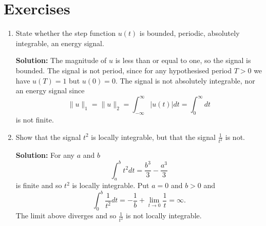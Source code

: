 \documentclass[11pt,a4paper]{book}
\theoremstyle{plain}
\numberwithin{equation}{section}
\newcommand{\abs}[1]{\left\vert #1 \right\vert}
\newenvironment{solution}{\begin{footnotesize}\textbf{Solution:}}{\end{footnotesize}}
\newenvironment{excersizelist}{%
  \renewcommand*{\theenumi}{\thechapter.\arabic{enumi}}%
  \newcommand\itemadvanced{\stepcounter{enumi}\item[$\ast$\, \theenumi.]}
  \begin{enumerate}
}{%
  \end{enumerate}
}
\begin{document}
\section{Exercises}

\begin{excersizelist}

\item \label{excer:stepfunction} State whether the step function $u(t)$ is bounded, periodic, %
absolutely integrable, an energy signal.
\begin{solution}
The magnitude of $u$ is less than or equal to one, so the signal is bounded.  The signal is not period, since for any hypothesised period $T > 0$ we have $u(T) = 1$ but $u(0) = 0$.  %
The signal is not absolutely integrable, nor an energy signal since
\[
\|u\|_1 = \|u\|_2 = \int_{-\infty}^\infty \abs{u(t)} dt = \int_{0}^\infty dt
\]
is not finite.
\end{solution}

\item \label{exer:oneontnotlocallyint} Show that the signal $t^2$ is locally integrable, but that the signal $\frac{1}{t^2}$ is not. 
\begin{solution}
For any $a$ and $b$
\[
\int_a^b t^2 dt = \frac{b^3}{3} - \frac{a^3}{3}
\]
is finite and so $t^2$ is locally integrable.  Put $a = 0$ and $b > 0$ and
\[
\int_0^b \frac{1}{t^2} dt = -\frac{1}{b} + \lim_{t \to 0}\frac{1}{t}  = \infty.
\]
The limit above diverges and so $\frac{1}{t^2}$ is not locally integrable. 
\end{solution}



\end{excersizelist}
\end{document}
